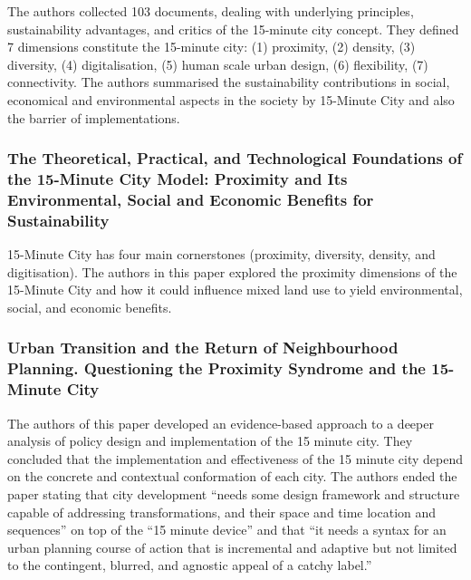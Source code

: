 The authors collected 103 documents, dealing with underlying principles, sustainability advantages, and critics of the 15-minute city concept. They defined 7 dimensions constitute the 15-minute city: (1) proximity, (2) density, (3) diversity, (4) digitalisation, (5) human scale
urban design, (6) flexibility, (7) connectivity. The authors summarised the sustainability contributions in social, economical and environmental aspects in the society by 15-Minute City and also the barrier of implementations.

\subsubsection{The Theoretical, Practical, and Technological Foundations of the 15-Minute City Model: Proximity and Its Environmental, Social and Economic Benefits for Sustainability \texorpdfstring{\cite{allam_theoretical_2022}}{}} \label{allam_theoretical_2022}

15-Minute City has four main cornerstones (proximity, diversity, density, and digitisation). The authors in this paper explored the proximity dimensions of the 15-Minute City and how it could influence mixed land use to yield environmental, social, and economic benefits.

\subsubsection{Urban Transition and the Return of Neighbourhood Planning. Questioning the Proximity Syndrome and the 15-Minute City \texorpdfstring{\cite{marchigiani_urban_2022}}{}} \label{marchigiani_urban_2022}

The authors of this paper developed an evidence-based approach to a deeper analysis of policy design and implementation of the 15 minute city. They concluded that the implementation and effectiveness of the 15 minute city depend on the concrete and contextual conformation of each city. The authors ended the paper stating that city development “needs some design framework and structure capable of addressing transformations, and their space and time location and sequences” on top of the “15 minute device” and that “it needs a syntax for an urban planning course of action that is incremental and adaptive but not limited to the contingent, blurred, and agnostic appeal of a catchy label.”
